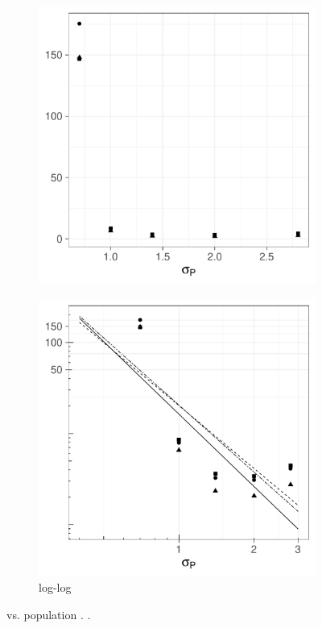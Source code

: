 \begin{figure}[htbp]
    \begin{subfigure}[t]{0.49\textwidth}
        \includegraphics[width=\textwidth]{results/by_population_spread/NMISE-vs-population-spread}
        \caption{}
        \label{fig:ise:pop_spread:nmise}
    \end{subfigure}
    \begin{subfigure}[t]{0.49\textwidth}
        \includegraphics[width=\textwidth]{results/by_population_spread/NMISE-vs-population-spread-log-log}
        \caption{ log-log}
        \label{fig:ise:pop_spread:nmise_log_log}
    \end{subfigure}
    \caption[: by population ]{ vs. population . \errorplotcaption.}
    \label{fig:ise:pop_spread}
\end{figure}

